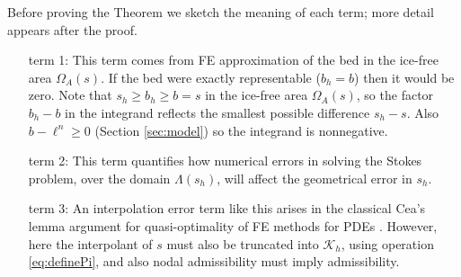 \documentclass[hidelinks,onefignum,onetabnum,final]{siamart220329}  %
\newcommand{\cK}{\mathcal{K}}
\begin{document}
Before proving the Theorem we sketch the meaning of each term; more detail appears after the proof.

\medskip
\begin{itemize}
\item[term 1:]  This term comes from FE approximation of the bed in the ice-free area $\Omega_A(s)$.  If the bed were exactly representable ($b_h=b$) then it would be zero.  Note that $s_h \ge b_h \ge b = s$ in the ice-free area $\Omega_A(s)$, so the factor $b_h-b$ in the integrand reflects the smallest possible difference $s_h - s$.  Also $b-\ell^n\ge 0$ (Section \ref{sec:model}) so the integrand is nonnegative.

\item[term 2:]  This term quantifies how numerical errors in solving the Stokes problem, over the domain $\Lambda(s_h)$, will affect the geometrical error in $s_h$.

\item[term 3:]  An interpolation error term like this arises in the classical Cea's lemma argument for quasi-optimality of FE methods for PDEs \cite{Ciarlet2002}.  However, here the interpolant of $s$ must also be truncated into $\cK_h$, using operation \eqref{eq:definePi}, and also nodal admissibility must imply admissibility.
\end{itemize}
\end{document}
